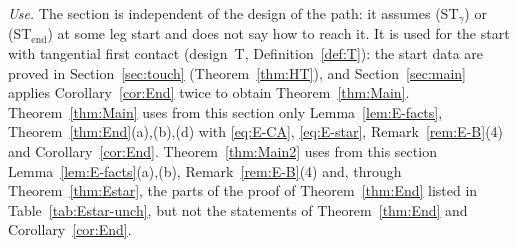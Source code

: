 \begin{remark}[Status]
\emph{Use.} The section is independent of the design of the path: it assumes \textup{(ST$_\gamma$)} or
\textup{(ST$_{\mathrm{end}}$)} at some leg start and does not say how to reach it. It is used for the start with tangential first
contact (design~T, Definition~\ref{def:T}): the start data are proved in Section~\ref{sec:touch} (Theorem~\ref{thm:HT}), and
Section~\ref{sec:main} applies Corollary~\ref{cor:End} twice to obtain Theorem~\ref{thm:Main}. Theorem~\ref{thm:Main} uses from
this section only Lemma~\ref{lem:E-facts}, Theorem~\ref{thm:End}(a),(b),(d) with \eqref{eq:E-CA}, \eqref{eq:E-star},
Remark~\ref{rem:E-B}(4) and Corollary~\ref{cor:End}. Theorem~\ref{thm:Main2} uses from this section Lemma~\ref{lem:E-facts}(a),(b),
Remark~\ref{rem:E-B}(4) and, through Theorem~\ref{thm:Estar}, the parts of the proof of Theorem~\ref{thm:End} listed in
Table~\ref{tab:Estar-unch}, but not the statements of Theorem~\ref{thm:End} and Corollary~\ref{cor:End}.
\end{remark}
